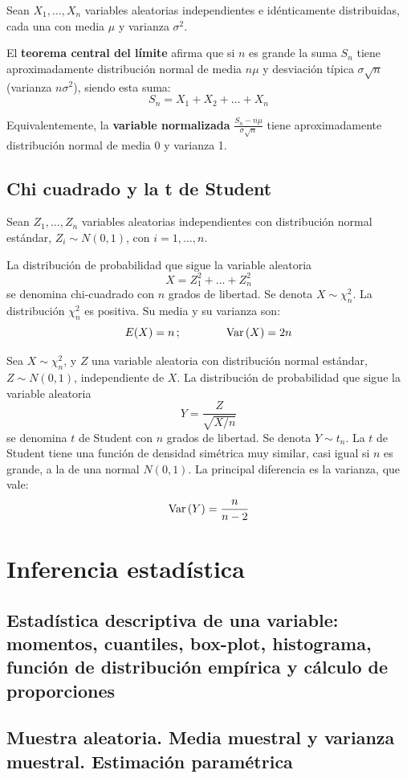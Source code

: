 \documentclass[a4paper]{book}
\begin{document}
Sean $X_1,\dots , X_n$ variables aleatorias independientes e idénticamente distribuidas, cada una con media $\mu$ y varianza $\sigma ^2$.

El \textbf{teorema central del límite} afirma que si $n$ es grande la suma $S_n$ tiene aproximadamente distribución normal de media $n\mu$ y desviación típica $\sigma \sqrt{n}$ (varianza $n\sigma ^2$), siendo esta suma:
\[ S_n = X_1 + X_2 + \dots + X_n \]

Equivalentemente, la \textbf{variable normalizada} $\frac{S_n-n\mu}{\sigma \sqrt{n}}$ tiene aproximadamente distribución normal de media 0 y varianza 1.

\section{Chi cuadrado y la t de Student}

Sean $Z_1,\dots ,Z_n$ variables aleatorias independientes con distribución normal estándar, $Z_i \sim N \left( 0,1 \right)$, con $i=1,\dots ,n$.

La distribución de probabilidad que sigue la variable aleatoria
\[ X=Z_1^2+\dots +Z_n^2 \]
se denomina chi-cuadrado con $n$ grados de libertad. Se denota $X\sim \chi _n^2$. La distribución $\chi _n^2$ es positiva. Su media y su varianza son:
\[ E (X) = n \, ; \qquad \qquad \operatorname{Var} \left( X \right)=2n \]

Sea $X\sim \chi _n^2$, y $Z$ una variable aleatoria con distribución normal estándar, $Z\sim N(0,1)$, independiente de $X$. La distribución de probabilidad que sigue la variable aleatoria
\[Y=\frac{Z}{\sqrt{X/n}}\]
se denomina $t$ de Student con $n$ grados de libertad. Se denota $Y\sim t_n$. La $t$ de Student tiene una función de densidad simétrica muy similar, casi igual si $n$ es grande, a la de una normal $N(0,1)$. La principal diferencia es la varianza, que vale:
\[ \operatorname{Var} \left( Y \right)=\frac{n}{n-2}  \]

\chapter{Inferencia estadística}

\section{Estadística descriptiva de una variable: momentos, cuantiles, box-plot, histograma, función de distribución empírica y cálculo de proporciones}
\section{Muestra aleatoria. Media muestral y varianza muestral. Estimación paramétrica}
\end{document}
